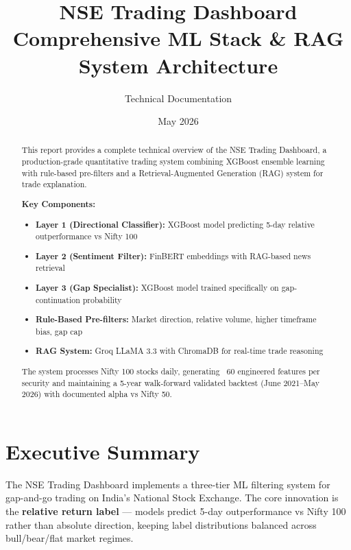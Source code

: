 \documentclass[11pt,a4paper]{article}
\title{\Huge\textbf{NSE Trading Dashboard}\\
        \Large Comprehensive ML Stack \& RAG System Architecture}
\author{Technical Documentation}
\date{May 2026}
\begin{document}
\maketitle

\begin{abstract}
This report provides a complete technical overview of the NSE Trading Dashboard, a production-grade quantitative trading system combining XGBoost ensemble learning with rule-based pre-filters and a Retrieval-Augmented Generation (RAG) system for trade explanation.

\textbf{Key Components:}
\begin{itemize}
    \item \textbf{Layer 1 (Directional Classifier):} XGBoost model predicting 5-day relative outperformance vs Nifty 100
    \item \textbf{Layer 2 (Sentiment Filter):} FinBERT embeddings with RAG-based news retrieval
    \item \textbf{Layer 3 (Gap Specialist):} XGBoost model trained specifically on gap-continuation probability
    \item \textbf{Rule-Based Pre-filters:} Market direction, relative volume, higher timeframe bias, gap cap
    \item \textbf{RAG System:} Groq LLaMA 3.3 with ChromaDB for real-time trade reasoning
\end{itemize}

The system processes Nifty 100 stocks daily, generating ~60 engineered features per security and maintaining a 5-year walk-forward validated backtest (June 2021–May 2026) with documented alpha vs Nifty 50.
\end{abstract}

\newpage
\tableofcontents
\newpage

\section{Executive Summary}

The NSE Trading Dashboard implements a three-tier ML filtering system for gap-and-go trading on India's National Stock Exchange. The core innovation is the \textbf{relative return label} — models predict 5-day outperformance vs Nifty 100 rather than absolute direction, keeping label distributions balanced across bull/bear/flat market regimes.
\end{document}
